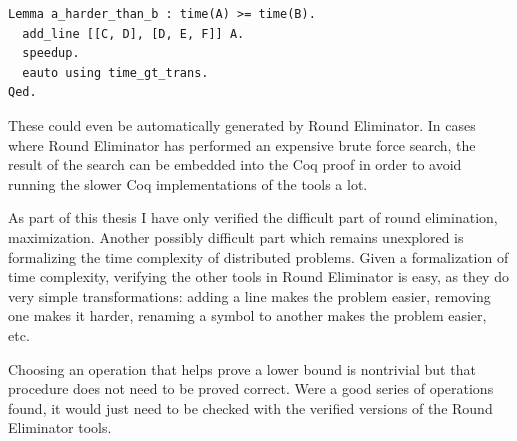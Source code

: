 \documentclass[english, 12pt, a4paper, sci, a-1b, online]{aaltothesis}
\begin{document}
\begin{verbatim}
Lemma a_harder_than_b : time(A) >= time(B).
  add_line [[C, D], [D, E, F]] A.
  speedup.
  eauto using time_gt_trans.
Qed.
\end{verbatim}

These could even be automatically generated by Round Eliminator. In cases where Round Eliminator has performed an expensive brute force search, the result of the search can be embedded into the Coq proof in order to avoid running the slower Coq implementations of the tools a lot.

As part of this thesis I have only verified the difficult part of round elimination, maximization. Another possibly difficult part which remains unexplored is formalizing the time complexity of distributed problems. Given a formalization of time complexity, verifying the other tools in Round Eliminator is easy, as they do very simple transformations: adding a line makes the problem easier, removing one makes it harder, renaming a symbol to another makes the problem easier, etc.

Choosing an operation that helps prove a lower bound is nontrivial but that procedure does not need to be proved correct. Were a good series of operations found, it would just need to be checked with the verified versions of the Round Eliminator tools.

\clearpage
\thesisbibliography{}



\end{document}
